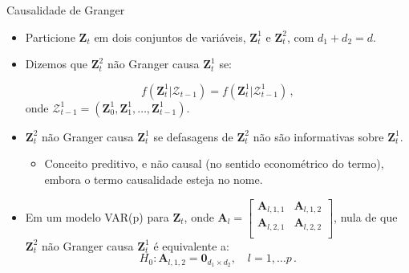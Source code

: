 \documentclass[11pt]{beamer}
\begin{document}
\begin{frame}{Causalidade de Granger}
	\begin{itemize}
		\item Particione $\boldsymbol{Z}_t$ em dois conjuntos de variáveis, $\boldsymbol{Z}^1_t$ e $\boldsymbol{Z}^2_t$, com $d_1 + d_2 = d$.
		\item Dizemos que $\boldsymbol{Z}^2_t$ {\color{blue}não Granger causa} $\boldsymbol{Z}^1_t$ se:
		
		$$f(\boldsymbol{Z}^1_t|\mathcal{Z}_{t-1}) = f(\boldsymbol{Z}^1_t|\mathcal{Z}^1_{t-1}) \,,$$
		onde $\mathcal{Z}_{t-1}^1 = (\boldsymbol{Z}_0^1, \boldsymbol{Z}_1^1,\ldots, \boldsymbol{Z}_{t-1}^1)$.
		\item $\boldsymbol{Z}^2_t$ {\color{blue}não Granger causa} $\boldsymbol{Z}^1_t$ se defasagens de $\boldsymbol{Z}^2_t$ não são informativas sobre $\boldsymbol{Z}^1_t$.
		\begin{itemize}
			\item {\color{red}Conceito preditivo}, e não causal (no sentido econométrico do termo), embora o termo causalidade esteja no nome.
		\end{itemize}
		\item Em um modelo VAR(p) para $\boldsymbol{Z}_t$, onde $\boldsymbol{A}_l = \begin{bmatrix}
		\boldsymbol{A}_{l,1,1} & 	\boldsymbol{A}_{l,1,2} \\
				\boldsymbol{A}_{l,2,1} & 	\boldsymbol{A}_{l,2,2} \\
		\end{bmatrix}$,
		nula de que $\boldsymbol{Z}^2_t$  não Granger causa  $\boldsymbol{Z}^1_t$  é equivalente a:
		$$H_0: 	\boldsymbol{A}_{l,1,2} = \boldsymbol{0}_{d_1\times d_2}, \quad l =1,\ldots p\, .$$
	\end{itemize}
\end{frame}
\end{document}
